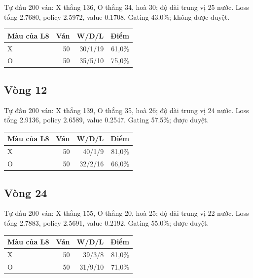Tự đấu 200 ván: X thắng 136, O thắng 34, hoà 30; độ dài trung vị 25 nước. Loss tổng 2.7680, policy 2.5972, value 0.1708. Gating 43.0\%; không được duyệt.

\begin{center}\small\begin{tabular}{@{}lrrr@{}}\toprule

Màu của L8 & Ván & W/D/L & Điểm \\

\midrule

X & 50 & 30/1/19 & 61,0\% \\

O & 50 & 35/5/10 & 75,0\% \\

\bottomrule\end{tabular}\end{center}

\subsection{Vòng 12}

Tự đấu 200 ván: X thắng 139, O thắng 35, hoà 26; độ dài trung vị 24 nước. Loss tổng 2.9136, policy 2.6589, value 0.2547. Gating 57.5\%; được duyệt.

\begin{center}\small\begin{tabular}{@{}lrrr@{}}\toprule

Màu của L8 & Ván & W/D/L & Điểm \\

\midrule

X & 50 & 40/1/9 & 81,0\% \\

O & 50 & 32/2/16 & 66,0\% \\

\bottomrule\end{tabular}\end{center}

\subsection{Vòng 24}

Tự đấu 200 ván: X thắng 155, O thắng 20, hoà 25; độ dài trung vị 22 nước. Loss tổng 2.7883, policy 2.5691, value 0.2192. Gating 55.0\%; được duyệt.

\begin{center}\small\begin{tabular}{@{}lrrr@{}}\toprule

Màu của L8 & Ván & W/D/L & Điểm \\

\midrule

X & 50 & 39/3/8 & 81,0\% \\

O & 50 & 31/9/10 & 71,0\% \\

\bottomrule\end{tabular}\end{center}

